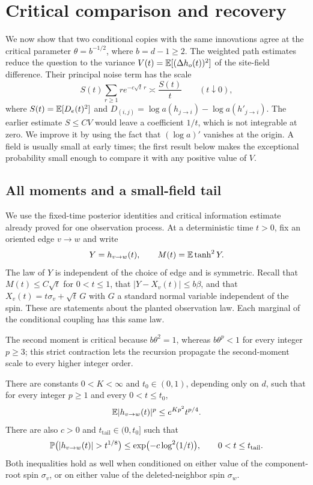 \section{Critical comparison and recovery}
\label{sec:uniqueness-factor}

We now show that two conditional copies with the same innovations agree
at the critical parameter $\theta=b^{-1/2}$, where $b=d-1\ge2$.
The weighted path estimates reduce the question to the variance
$V(t)=\mathbb E[(\Delta h_o(t))^2]$ of the site-field difference.
Their principal noise term has the scale
\[
 S(t)\sum_{r\ge1}r e^{-c\sqrt t\,r}\asymp \frac{S(t)}{t}
 \qquad(t\downarrow0),
\]
where $S(t)=\mathbb E[D_e(t)^2]$ and
$D_{(i,j)}=\log a(h_{j\to i})-\log a(h'_{j\to i})$.
The earlier estimate $S\le CV$ would leave a coefficient $1/t$,
which is not integrable at zero.  We improve it by using the fact that
$(\log a)'$ vanishes at the origin.  A field is usually small at early
times; the first result below makes the exceptional probability small
enough to compare it with any positive value of $V$.

\subsection{All moments and a small-field tail}

We use the fixed-time posterior identities and critical information
estimate already proved for one observation process.  At a deterministic
time $t>0$, fix an oriented edge $v\to w$ and write
\[
 Y=h_{v\to w}(t),\qquad M(t)=\mathbb E\tanh^2Y.
\]
The law of $Y$ is independent of the choice of edge and is symmetric.
Recall that $M(t)\le C\sqrt t$ for $0<t\le1$, that
$|Y-X_v(t)|\le b\beta$, and that
$X_v(t)=t\sigma_v+\sqrt t\,G$ with $G$ a standard normal variable
independent of the spin.  These are statements about the planted
observation law.  Each marginal of the conditional coupling has this
same law.

The second moment is critical because $b\theta^2=1$, whereas
$b\theta^p<1$ for every integer $p\ge3$; this strict contraction
lets the recursion propagate the second-moment scale to every higher
integer order.

\begin{lemma}
\label{lem:critical-tail}
There are constants $0<K<\infty$ and $t_0\in(0,1)$, depending only on
$d$, such that for every integer $p\ge1$ and every $0<t\le t_0$,
\begin{equation}
 \mathbb E|h_{v\to w}(t)|^p\le e^{Kp^2}t^{p/4}.
 \label{eq:critical-all-moments}
\end{equation}
There are also $c>0$ and $t_{\mathrm{tail}}\in(0,t_0]$ such that
\begin{equation}
 \P\bigl(|h_{v\to w}(t)|>t^{1/8}\bigr)
 \le \exp\bigl(-c\log^2(1/t)\bigr),
 \qquad 0<t\le t_{\mathrm{tail}}.
 \label{eq:critical-field-tail}
\end{equation}
Both inequalities hold as well when conditioned on either value of the
component-root spin $\sigma_v$, or on either value of the deleted-neighbor
spin $\sigma_w$.
\end{lemma}

